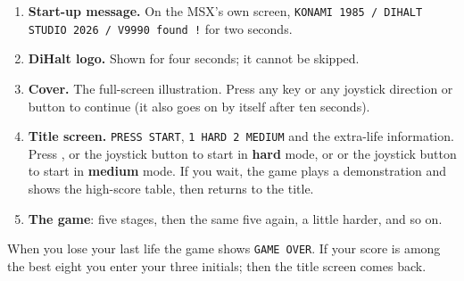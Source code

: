 \begin{enumerate}
\item \textbf{Start-up message.} On the MSX's own screen, \texttt{KONAMI 1985 / DIHALT STUDIO 2026 / V9990 found !} for two seconds.
\item \textbf{DiHalt logo.} Shown for four seconds; it cannot be skipped.
\item \textbf{Cover.} The full-screen illustration. Press any key or any joystick direction or button to continue (it also goes on by itself after ten seconds).
\item \textbf{Title screen.} \texttt{PRESS START}, \texttt{1 HARD 2 MEDIUM} and the extra-life information. Press ,  or the joystick button  to start in \textbf{hard} mode, or  or the joystick button  to start in \textbf{medium} mode. If you wait, the game plays a demonstration and shows the high-score table, then returns to the title.
\item \textbf{The game}: five stages, then the same five again, a little harder, and so on.
\end{enumerate}

When you lose your last life the game shows \texttt{GAME OVER}. If your score is among the best eight you enter your three initials; then the title screen comes back.
